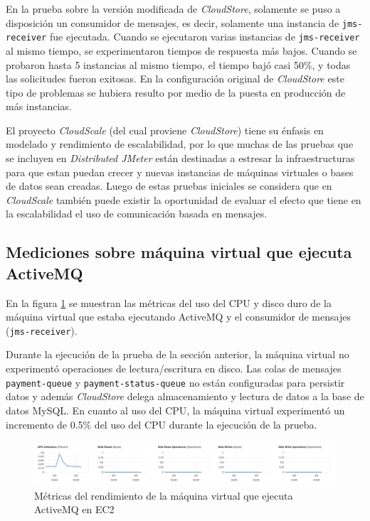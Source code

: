 \documentclass[11pt, twoside]{report}
\begin{document}
En la prueba sobre la versión modificada de \emph{CloudStore}, solamente se puso a disposición un consumidor de mensajes, es decir, solamente una instancia de \texttt{jms-receiver} fue ejecutada. Cuando se ejecutaron varias instancias de \texttt{jms-receiver} al mismo tiempo, se experimentaron tiempos de respuesta más bajos. Cuando se probaron hasta 5 instancias al mismo tiempo, el tiempo bajó casi 50\%, y todas las solicitudes fueron exitosas. En la configuración original de \emph{CloudStore} este tipo de problemas se hubiera resulto por medio de la puesta en producción de más instancias.

El proyecto \emph{CloudScale} (del cual proviene \emph{CloudStore}) tiene su énfasis en modelado y rendimiento de escalabilidad, por lo que muchas de las pruebas que se incluyen en \emph{Distributed JMeter} están destinadas a estresar la infraestructuras para que estan puedan crecer y nuevas instancias de máquinas virtuales o bases de datos sean creadas. Luego de estas pruebas iniciales se considera que en \emph{CloudScale} también puede existir la oportunidad de evaluar el efecto que tiene en la escalabilidad el uso de comunicación basada en mensajes.

\subsection{Mediciones sobre máquina virtual que ejecuta ActiveMQ}
En la figura \ref{fig:aws-activemq-metrics} se muestran las métricas del uso del CPU y disco duro de la máquina virtual que estaba ejecutando ActiveMQ y el consumidor de mensajes (\texttt{jms-receiver}).

Durante la ejecución de la prueba de la sección anterior, la máquina virtual no experimentó operaciones de lectura/escritura en disco. Las colas de mensajes \texttt{payment-queue} y \texttt{payment-status-queue} no están configuradas para persistir datos y además \emph{CloudStore} delega almacenamiento y lectura de datos a la base de datos MySQL. En cuanto al uso del CPU, la máquina virtual experimentó un incremento de 0.5\% del uso del CPU durante la ejecución de la prueba. 

\begin{figure}[h]
  \centering
  \includegraphics[width=18cm]{aws-activemq-metrics}
  \caption{\small{Métricas del rendimiento de la máquina virtual que ejecuta ActiveMQ en EC2}}
  \label{fig:aws-activemq-metrics}
\end{figure}
\end{document}
